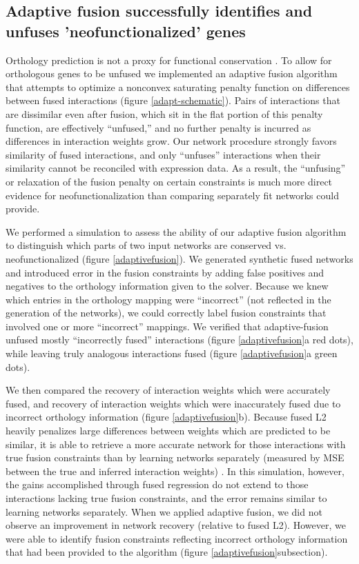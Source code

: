 \documentclass[11pt]{article}
\begin{document}
\subsection{Adaptive fusion successfully identifies and unfuses 'neofunctionalized' genes}
Orthology prediction is not a proxy for functional conservation \cite{gabaldon_functional_2013, studer_how_2009, nehrt_testing_2011}. 
To allow for orthologous genes to be unfused we implemented an adaptive fusion algorithm that attempts to optimize a nonconvex saturating penalty function on differences between fused interactions (figure \ref{adapt-schematic}). 
Pairs of interactions that are dissimilar even after fusion, which sit in the flat portion of this penalty function, are effectively ``unfused,'' and no further penalty is incurred as differences in interaction weights grow. 
Our network procedure strongly favors similarity of fused interactions, and only ``unfuses'' interactions when their similarity cannot be reconciled with expression data. 
As a result, the ``unfusing'' or relaxation of the fusion penalty on certain constraints is much more direct evidence for neofunctionalization than comparing separately fit networks could provide. 

We performed a simulation to assess the ability of our adaptive fusion algorithm to distinguish which parts of two input networks are conserved vs. neofunctionalized (figure \ref{adaptivefusion}). We generated synthetic fused networks and introduced error in the fusion constraints by adding false positives and negatives to the orthology information given to the solver. 
Because we knew which entries in the orthology mapping were ``incorrect'' (not reflected in the generation of the networks), we could correctly label fusion constraints that involved one or more ``incorrect'' mappings. 
We verified that adaptive-fusion unfused mostly ``incorrectly fused'' interactions (figure \ref{adaptivefusion}a red dots), while leaving truly analogous interactions fused (figure \ref{adaptivefusion}a green dots). 

We then compared the recovery of interaction weights which were accurately fused, and recovery of interaction weights which were inaccurately fused due to incorrect orthology information (figure \ref{adaptivefusion}b). 
Because fused L2 heavily penalizes large differences between weights which are predicted to be similar, it is able to retrieve a more accurate network for those interactions with true fusion constraints than by learning networks separately (measured by MSE between the true and inferred interaction weights) . 
In this simulation, however, the gains accomplished through fused regression do not extend to those interactions lacking true fusion constraints, and the error remains similar to learning networks separately. When we applied adaptive fusion, we did not observe an improvement in network recovery (relative to fused L2). 
However, we were able to identify fusion constraints reflecting incorrect orthology information that had been provided to the algorithm (figure \ref{adaptivefusion}subsection). 
\end{document}
